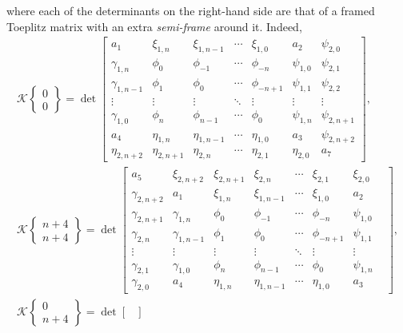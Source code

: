 \documentclass[pdftex]{sigma}
\numberwithin{equation}{section}
\newcommand{\ga}{\gamma}
\begin{document}
		where each of the determinants on the right-hand side are that of a framed Toeplitz matrix with an extra \textit{semi-frame} around it. Indeed,
		\begin{gather*}
			\mathscr{K}\left\lbrace \begin{matrix} 0 \\ 0 \end{matrix} \right\rbrace = \det \begin{bmatrix}
				a_1 & \xi_{1,n} & \xi_{1,n-1} & \cdots & \xi_{1,0} & a_2 & \psi_{2,0} \\
				\ga_{1,n} &	\phi_0& \phi_{-1} & \cdots & \phi_{-n} & \psi_{1,0} & \psi_{2,1} \\
				\ga_{1,n-1} &	\phi_{1}& \phi_0 & \cdots & \phi_{-n+1} & \psi_{1,1} & \psi_{2,2} \\
				\vdots & \vdots & \vdots & \ddots & \vdots & \vdots & \vdots \\
				\ga_{1,0} &	\phi_{n} & \phi_{n-1} & \cdots & \phi_{0} & \psi_{1,n} & \psi_{2,n+1} \\
				a_4 &	\eta_{1,n} & \eta_{1,n-1} & \cdots & \eta_{1,0} & a_3 & \psi_{2,n+2} \\
				\eta_{2,n+2} &	\eta_{2,n+1} & \eta_{2,n} & \cdots & \eta_{2,1} & \eta_{2,0} & a_7
			\end{bmatrix},
\\
			\mathscr{K}\left\lbrace \begin{matrix} n+4 \\ n+4 \end{matrix} \right\rbrace	= \det	\begin{bmatrix}
				a_5 & \xi_{2,n+2} & \xi_{2,n+1} & \xi_{2,n} & \cdots & \xi_{2,1} & \xi_{2,0} \\
				\ga_{2,n+2} &	a_1 & \xi_{1,n} & \xi_{1,n-1} & \cdots & \xi_{1,0} & a_2 \\
				\ga_{2,n+1} &	\ga_{1,n} &	\phi_0& \phi_{-1} & \cdots & \phi_{-n} & \psi_{1,0} \\
				\ga_{2,n} &	\ga_{1,n-1} &	\phi_{1}& \phi_0 & \cdots & \phi_{-n+1} & \psi_{1,1} \\
				\vdots &	\vdots & \vdots & \vdots & \ddots & \vdots & \vdots \\
				\ga_{2,1} &	\ga_{1,0} &	\phi_{n} & \phi_{n-1} & \cdots & \phi_{0} & \psi_{1,n} \\
				\ga_{2,0} &	a_4 &	\eta_{1,n} & \eta_{1,n-1} & \cdots & \eta_{1,0} & a_3 &
			\end{bmatrix},
\\
			\mathscr{K}\left\lbrace \begin{matrix} 0 \\ n+4 \end{matrix} \right\rbrace	= \det \begin{bmatrix}

\end{bmatrix}
\end{gather*}
\end{document}
